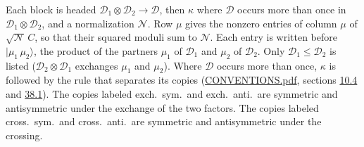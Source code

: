 \documentclass[10pt,a4paper]{article}
\numberwithin{equation}{section}
\newcommand{\irrprod}{\otimes}
\newcommand{\mult}{\kappa}
\newcommand{\intx}{\mu}
\newcommand{\cgnorm}{\mathcal{N}}
\newcommand{\prodket}[2]{\lvert {#1}\,{#2}\rangle}
\begin{document}
Each block is headed $\mathcal{D}_1\irrprod\mathcal{D}_2\to\mathcal{D}$, then $\mult$ where $\mathcal{D}$ occurs more than once in $\mathcal{D}_1\irrprod\mathcal{D}_2$, and a normalization $\cgnorm$. Row $\intx$ gives the nonzero entries of column $\intx$ of $\sqrt{\cgnorm}\,C$, so that their squared moduli sum to $\cgnorm$. \label{n:vector.ket.product}Each entry is written before $\prodket{\intx_1}{\intx_2}$, the product of the partners $\intx_1$ of $\mathcal{D}_1$ and $\intx_2$ of $\mathcal{D}_2$. Only $\mathcal{D}_1 \le \mathcal{D}_2$ is listed ($\mathcal{D}_2\irrprod\mathcal{D}_1$ exchanges $\intx_1$ and $\intx_2$).
Where $\mathcal{D}$ occurs more than once, $\mult$ is followed by the rule that separates its copies (\href{../../CONVENTIONS.pdf}{CONVENTIONS.pdf}, sections \href{../../../rotation/CONVENTIONS.pdf\#conv.10.4}{10.4} and \href{../../CONVENTIONS.pdf\#conv.38.1}{38.1}). \label{n:abbreviation.exchange}The copies labeled exch.\ sym.\ and exch.\ anti.\ are symmetric and antisymmetric under the exchange of the two factors. \label{n:abbreviation.crossing}The copies labeled cross.\ sym.\ and cross.\ anti.\ are symmetric and antisymmetric under the crossing.
\end{document}
